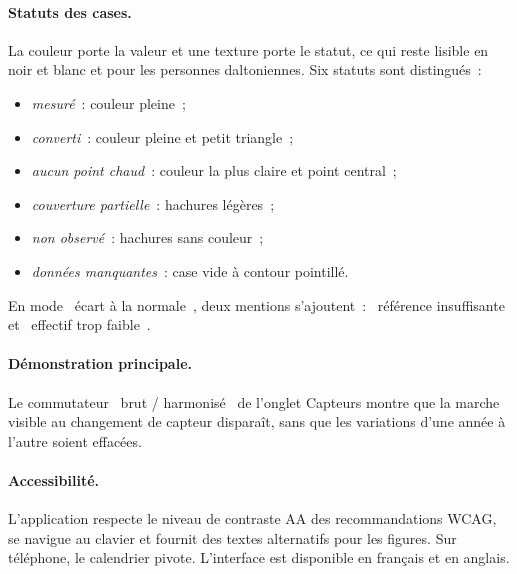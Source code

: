 \documentclass[11pt,a4paper]{article}
\newcommand{\og}{\guillemotleft~}
\newcommand{\fg}{~\guillemotright}
\begin{document}
\paragraph{Statuts des cases.} La couleur porte la valeur et une texture porte le statut, ce qui reste lisible en noir et blanc et pour les personnes daltoniennes. Six statuts sont distingués~:
\begin{itemize}
  \item \emph{mesuré}~: couleur pleine~;
  \item \emph{converti}~: couleur pleine et petit triangle~;
  \item \emph{aucun point chaud}~: couleur la plus claire et point central~;
  \item \emph{couverture partielle}~: hachures légères~;
  \item \emph{non observé}~: hachures sans couleur~;
  \item \emph{données manquantes}~: case vide à contour pointillé.
\end{itemize}
En mode \og écart à la normale\fg, deux mentions s'ajoutent~: \og référence insuffisante\fg{} et \og effectif trop faible\fg.

\paragraph{Démonstration principale.} Le commutateur \og brut / harmonisé\fg{} de l'onglet Capteurs montre que la marche visible au changement de capteur disparaît, sans que les variations d'une année à l'autre soient effacées.

\paragraph{Accessibilité.} L'application respecte le niveau de contraste AA des recommandations WCAG, se navigue au clavier et fournit des textes alternatifs pour les figures. Sur téléphone, le calendrier pivote. L'interface est disponible en français et en anglais.
\end{document}
